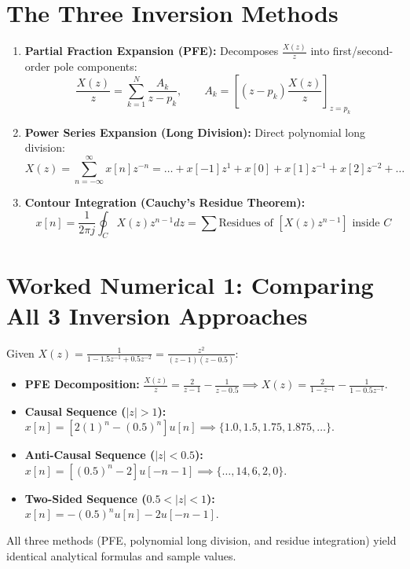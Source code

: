 \documentclass[11pt,a4paper]{article}
\begin{document}
\section{The Three Inversion Methods}
\begin{enumerate}
    \item \textbf{Partial Fraction Expansion (PFE):} Decomposes $\frac{X(z)}{z}$ into first/second-order pole components:
    \begin{equation}
    \frac{X(z)}{z} = \sum_{k=1}^{N} \frac{A_k}{z-p_k}, \qquad A_k = \left[ (z-p_k) \frac{X(z)}{z} \right]_{z=p_k}
    \end{equation}
    \item \textbf{Power Series Expansion (Long Division):} Direct polynomial long division:
    \begin{equation}
    X(z) = \sum_{n=-\infty}^{\infty} x[n] z^{-n} = \dots + x[-1]z^1 + x[0] + x[1]z^{-1} + x[2]z^{-2} + \dots
    \end{equation}
    \item \textbf{Contour Integration (Cauchy's Residue Theorem):}
    \begin{equation}
    x[n] = \frac{1}{2\pi j} \oint_{C} X(z) z^{n-1} dz = \sum \text{Residues of } \left[ X(z)z^{n-1} \right] \text{ inside } C
    \end{equation}
\end{enumerate}

\section{Worked Numerical 1: Comparing All 3 Inversion Approaches}
Given $X(z) = \frac{1}{1 - 1.5 z^{-1} + 0.5 z^{-2}} = \frac{z^2}{(z - 1)(z - 0.5)}$:
\begin{itemize}
    \item \textbf{PFE Decomposition:} $\frac{X(z)}{z} = \frac{2}{z-1} - \frac{1}{z-0.5} \implies X(z) = \frac{2}{1-z^{-1}} - \frac{1}{1-0.5 z^{-1}}$.
    \item \textbf{Causal Sequence ($|z|>1$):} $x[n] = \left[ 2(1)^n - (0.5)^n \right] u[n] \implies \{1.0, 1.5, 1.75, 1.875, \dots\}$.
    \item \textbf{Anti-Causal Sequence ($|z|<0.5$):} $x[n] = \left[ (0.5)^n - 2 \right] u[-n-1] \implies \{\dots, 14, 6, 2, 0\}$.
    \item \textbf{Two-Sided Sequence ($0.5<|z|<1$):} $x[n] = -(0.5)^n u[n] - 2 u[-n-1]$.
\end{itemize}
All three methods (PFE, polynomial long division, and residue integration) yield identical analytical formulas and sample values.
\end{document}
